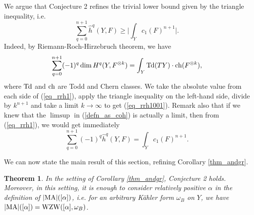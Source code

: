 \documentclass[12pt]{article}
\numberwithin{equation}{section}
\theoremstyle{theorem}
\newtheorem{thm}{Theorem}[section]
\theoremstyle{definition}
\theoremstyle{remark}
\begin{document}
	\par 
	We argue that Conjecture 2 refines the trivial lower bound given by the triangle inequality, i.e.	
	\begin{equation}\label{eq_rrh1001}
		\sum_{q = 0}^{n + 1} \hat{h}^q(Y, F) 
		\geq
		\Big| \int_Y c_1(F)^{n + 1} \Big|.
	\end{equation}
	Indeed, by Riemann-Roch-Hirzebruch theorem, we have
	\begin{equation}\label{eq_rrh1}
		\sum_{q = 0}^{n + 1} (-1)^q \dim H^q(Y, F^{\otimes k})
		=
		\int_Y {\rm{Td}}(TY) \cdot {\rm{ch}}(F^{\otimes k}),
	\end{equation}
	where ${\rm{Td}}$ and ${\rm{ch}}$ are Todd and Chern classes.
	We take the absolute value from each side of (\ref{eq_rrh1}), apply the triangle inequality on the left-hand side, divide by $k^{n + 1}$ and take a limit $k \to \infty$ to get (\ref{eq_rrh1001}).
	Remark also that if we knew that the $\limsup$ in (\ref{defn_as_coh}) is actually a limit, then from (\ref{eq_rrh1}), we would get immediately
	\begin{equation}\label{eq_rrh0}
		\sum_{q = 0}^{n + 1} (-1)^q \hat{h}^q(Y, F) = \int_Y c_1(F)^{n + 1}.
	\end{equation}	
	\par 
	We can now state the main result of this section, refining Corollary \ref{thm_andgr}.
	\begin{thm}\label{thm_maabs_conj}
		In the setting of Corollary \ref{thm_andgr}, Conjecture 2 holds.
		Moreover, in this setting, it is enough to consider relatively positive $\alpha$ in the definition of $|{\rm{MA}}|([\alpha])$, i.e. for an arbitrary Kähler form $\omega_B$ on $Y$, we have $|{\rm{MA}}|([\alpha]) = {\rm{WZW}}([\alpha], \omega_B)$.
	\end{thm}
\end{document}
